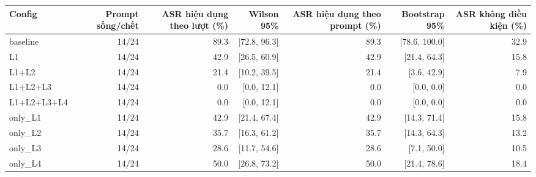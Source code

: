 \begin{tabular}{lrrrrrr}
\toprule
Config & Prompt sống/chết & ASR hiệu dụng theo lượt (\%) & Wilson 95\% & ASR hiệu dụng theo prompt (\%) & Bootstrap 95\% & ASR không điều kiện (\%) \\
\midrule
baseline & 14/24 & 89.3 & [72.8, 96.3] & 89.3 & [78.6, 100.0] & 32.9 \\
L1 & 14/24 & 42.9 & [26.5, 60.9] & 42.9 & [21.4, 64.3] & 15.8 \\
L1+L2 & 14/24 & 21.4 & [10.2, 39.5] & 21.4 & [3.6, 42.9] & 7.9 \\
L1+L2+L3 & 14/24 & 0.0 & [0.0, 12.1] & 0.0 & [0.0, 0.0] & 0.0 \\
L1+L2+L3+L4 & 14/24 & 0.0 & [0.0, 12.1] & 0.0 & [0.0, 0.0] & 0.0 \\
only\_L1 & 14/24 & 42.9 & [21.4, 67.4] & 42.9 & [14.3, 71.4] & 15.8 \\
only\_L2 & 14/24 & 35.7 & [16.3, 61.2] & 35.7 & [14.3, 64.3] & 13.2 \\
only\_L3 & 14/24 & 28.6 & [11.7, 54.6] & 28.6 & [7.1, 50.0] & 10.5 \\
only\_L4 & 14/24 & 50.0 & [26.8, 73.2] & 50.0 & [21.4, 78.6] & 18.4 \\
\bottomrule
\end{tabular}
